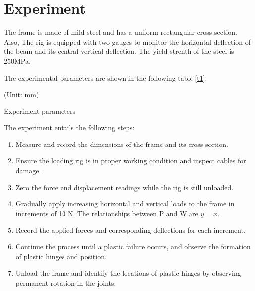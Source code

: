 \section{Experiment}
\FloatBarrier %

The frame is made of mild steel and has a uniform rectangular cross-section. Also, The rig is equipped with two gauges to monitor the horizontal deflection of the beam and its central vertical deflection. The yield strenth of the steel is 250MPa.

The experimental parameters are shown in the following table \autoref{t1}.

\begin{minipage}[htbp]{\textwidth}
    \makeatletter{}
    \centering

    (Unit: mm)
    \caption{Experiment parameters}
    \label{t1} 
\end{minipage}


The experiment entails the following steps:
\begin{enumerate}
    \item Measure and record the dimensions of the frame and its cross-section.

    \item Ensure the loading rig is in proper working condition and inspect cables for damage.
    
    \item Zero the force and displacement readings while the rig is still unloaded.
    
    \item Gradually apply increasing horizontal and vertical loads to the frame in increments of 10 N. The relationships between P and W are $y=x$\label{ee1}.
    
    \item Record the applied forces and corresponding deflections for each increment.
    
    \item Continue the process until a plastic failure occurs, and observe the formation of plastic hinges and position.
    
    \item Unload the frame and identify the locations of plastic hinges by observing permanent rotation in the joints.
    
\end{enumerate}

